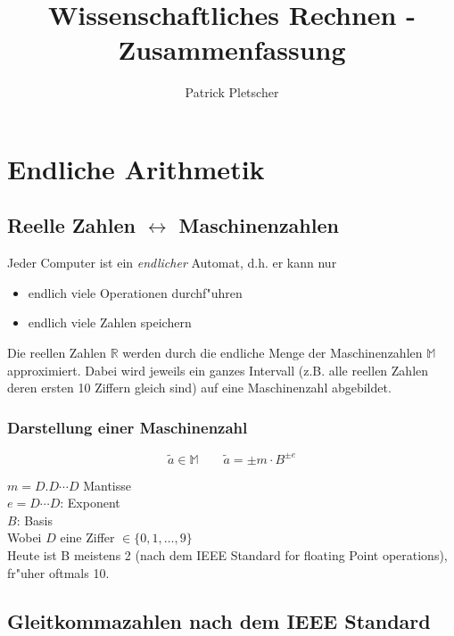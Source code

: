 \documentclass[german, 10pt, a4paper, twocolumn]{scrartcl}
\title{Wissenschaftliches Rechnen - Zusammenfassung}
\author{Patrick Pletscher}
\theoremstyle{definition}
\begin{document}
\maketitle

\section{Endliche Arithmetik}

\subsection{Reelle Zahlen $\leftrightarrow$ Maschinenzahlen}

Jeder Computer ist ein \textit{endlicher} Automat, d.h. er kann nur
\begin{itemize}
	\item endlich viele Operationen durchf"uhren
	\item endlich viele Zahlen speichern
\end{itemize}

Die reellen Zahlen $\mathbb{R}$ werden durch die endliche Menge der Maschinenzahlen $\mathbb{M}$ approximiert. Dabei wird jeweils ein ganzes Intervall (z.B. alle reellen Zahlen deren ersten 10 Ziffern gleich sind) auf eine Maschinenzahl abgebildet.

\subsubsection{Darstellung einer Maschinenzahl}

\begin{displaymath}
	\tilde{a}\in \mathbb{M} \qquad \tilde{a} = \pm m \cdotp B^{\pm e}
\end{displaymath}

$m= D.D\cdots D$ Mantisse\\
$e=D\cdots D$: Exponent\\
$B$: Basis\\

Wobei $D$ eine Ziffer $\in\{0,1,\ldots,9\}$\\

Heute ist B meistens 2 (nach dem IEEE Standard for floating Point operations), fr"uher oftmals 10.

\subsection{Gleitkommazahlen nach dem IEEE Standard}
\end{document}
